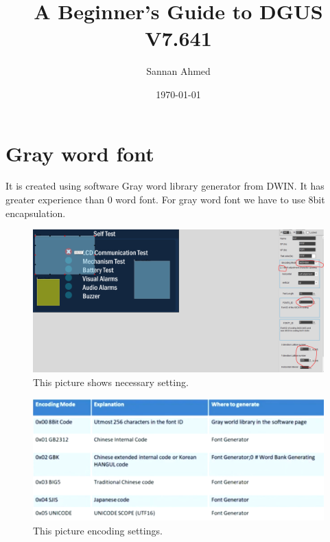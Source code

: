 \documentclass[12pt, A4]{article} %
\title{A Beginner's Guide to DGUS V7.641}
\author{Sannan Ahmed}
\date{\today} %
\begin{document}

\begin{titlepage}
\maketitle
\thispagestyle{empty} %
\end{titlepage}


\tableofcontents
\newpage

\section{Gray word font}

It is created using software Gray word library generator from DWIN. It has greater experience than 0 word font. For gray word font we have to use 8bit encapsulation.

\begin{figure}[!htb] %
	\centering
	\includegraphics[width=14cm]{grayFont} 
	\caption{This picture shows necessary setting.}
\end{figure}

\begin{figure}[!htb] %
	\centering
	\includegraphics[width=14cm]{encoding} 
	\caption{This picture encoding settings.}
\end{figure}
\end{document}
